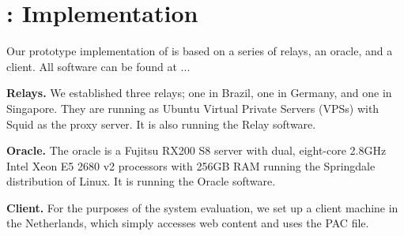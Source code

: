 \section{\system{}: Implementation}
Our prototype implementation of \system{} is based on a series of relays, an oracle, and 
a client. All \system{} software can be found at ... 

{\bf Relays.}  We established three relays; one in Brazil, one in Germany, and 
one in Singapore.  They are running as Ubuntu Virtual Private Servers (VPSs) with 
Squid as the proxy server.  It is also running the \system{} Relay software.

{\bf Oracle.}  The oracle is a Fujitsu RX200 S8 server with dual, 
eight-core 2.8GHz Intel Xeon E5 2680 v2 processors with 256GB RAM running the 
Springdale distribution of Linux. It is running the \system{} Oracle software.

{\bf Client.} For the purposes of the system evaluation, we set up a client 
machine in the Netherlands, which simply accesses web content and uses the PAC 
file.
